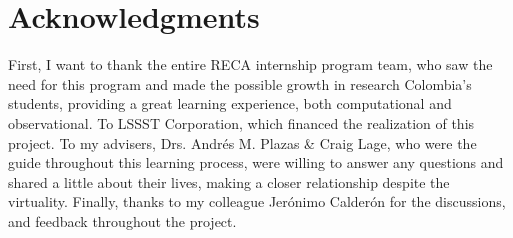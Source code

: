 \section{Acknowledgments} \label{sec:acknowledgments}


First, I want to thank the entire RECA internship program team, who saw the need for this program and made the possible growth in research Colombia's students, providing a great learning experience, both computational and observational. To LSSST Corporation, which financed the realization of this project. To my advisers, Drs. Andrés M. Plazas \& Craig Lage, who were the guide throughout this learning process, were willing to answer any questions and shared a little about their lives, making a closer relationship despite the virtuality. Finally, thanks to my colleague Jerónimo Calderón for the discussions, and feedback throughout the project.
